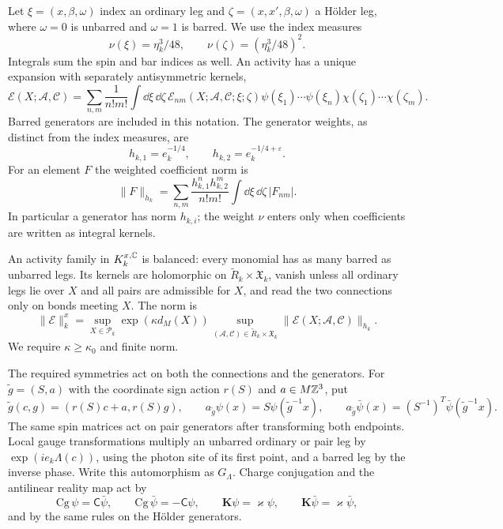 Let $\xi=(x,\beta,\omega)$ index an ordinary leg and
$\zeta=(x,x',\beta,\omega)$ a H\"older leg, where
$\omega=0$ is unbarred and $\omega=1$ is barred.
We use the index measures
\[
 \nu(\xi)=\eta_k^3/48,\qquad
 \nu(\zeta)=(\eta_k^3/48)^2.
\]
Integrals sum the spin and bar indices as well. An activity
has a unique expansion with separately antisymmetric kernels,
\begin{equation}\label{eq:rg-activity-kernels}
 \mathscr E(X;\mathscr A,\mathscr C)
 =\sum_{n,m}\frac1{n!m!}\int\dd\xi\,\dd\zeta\,
      \mathscr E_{nm}(X;\mathscr A,\mathscr C;\xi;\zeta)
                       \psi(\xi_1)\cdots\psi(\xi_n)
                       \chi(\zeta_1)\cdots\chi(\zeta_m).
\end{equation}
Barred generators are included in this notation.
The generator weights, as distinct from the index measures, are
\[
 h_{k,1}=e_k^{-1/4},\qquad h_{k,2}=e_k^{-1/4+\varepsilon}.
\]
For an element $F$ the weighted coefficient norm is
\begin{equation}\label{eq:rg-activity-coefficient-norm}
 \|F\|_{h_k}
       =\sum_{n,m}\frac{h_{k,1}^nh_{k,2}^m}{n!m!}
                                   \int\dd\xi\,\dd\zeta\,|F_{nm}|.
\end{equation}
In particular a generator has norm $h_{k,i}$;
the weight $\nu$ enters only when coefficients are written as
integral kernels.

An activity family in $K_k^{x,\mathbb C}$ is balanced: every monomial
has as many barred as unbarred legs. Its kernels are holomorphic
on $\widetilde R_k\times\mathfrak X_k$, vanish unless all ordinary
legs lie over $X$ and all pairs are admissible for $X$, and read
the two connections only on bonds meeting $X$. The norm is
\begin{equation}\label{eq:rg-activity-norm}
 \|\mathscr E\|_k^x
  =\sup_{X\in\mathcal P_k}\exp(\kappa d_M(X))
    \sup_{(\mathscr A,\mathscr C)\in\widetilde R_k\times\mathfrak X_k}
                          \|\mathscr E(X;\mathscr A,\mathscr C)\|_{h_k}.
\end{equation}
We require $\kappa\ge\kappa_0$ and finite norm.

The required symmetries act on both the connections and the
generators. For $\tilde g=(S,a)$ with the coordinate sign action
$r(S)$ and $a\in M\mathbb Z^3$, put
\[
 \tilde g(c,g)=(r(S)c+a,r(S)g),\qquad
 a_{\tilde g}\psi(x)=S\psi(\tilde g^{-1}x),\qquad
 a_{\tilde g}\bar\psi(x)=(S^{-1})^T\bar\psi(\tilde g^{-1}x).
\]
The same spin matrices act on pair generators after transforming
both endpoints. Local gauge transformations multiply an unbarred
ordinary or pair leg by $\exp(ie_k\Lambda(c))$, using the photon
site of its first point, and a barred leg by the inverse phase.
Write this automorphism as $G_\Lambda$.
Charge conjugation and the antilinear reality map act by
\[
 \mathrm{Cg}\,\psi=\mathsf C\bar\psi,\qquad
 \mathrm{Cg}\,\bar\psi=-\mathsf C\psi,\qquad
 \mathbf K\psi=\varkappa\psi,\qquad
 \mathbf K\bar\psi=\varkappa\bar\psi,
\]
and by the same rules on the H\"older generators.

